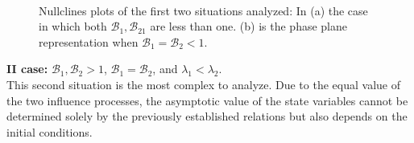 \begin{figure}[ht]
	\centering
	 \quad
	 \\
	\caption[Nullclines first figure]{Nullclines plots of the first two situations analyzed: In (a) the case in which both $\mathcal{B}_1, \mathcal{B}_21$ are less than one. (b) is the phase plane representation when $\mathcal{B}_1 = \mathcal{B}_2 <1$.  }
	\label{fig:r1r2less1dyn}
\end{figure}

\noindent\textbf{II case: } $\mathcal{B}_1, \mathcal{B}_2 >1$, $\mathcal{B}_1 =  \mathcal{B}_2$, and $\lambda_1 < \lambda_2$.\\
This second situation is the most complex to analyze. Due to the equal value of the two influence processes, the asymptotic value of the state variables cannot be determined solely by the previously established relations but also depends on the initial conditions.

